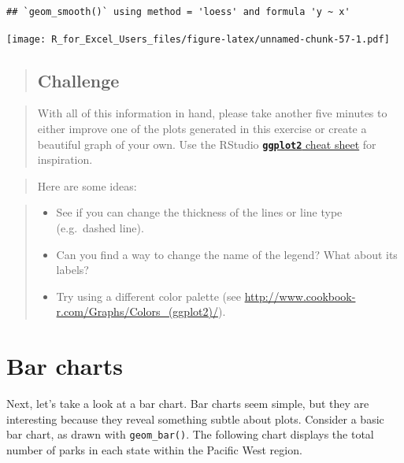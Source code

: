 \documentclass[]{book}
\providecommand{\tightlist}{%
  \setlength{\itemsep}{0pt}\setlength{\parskip}{0pt}}
\begin{document}
\begin{verbatim}
## `geom_smooth()` using method = 'loess' and formula 'y ~ x'
\end{verbatim}

\texttt{[image: R\_for\_Excel\_Users\_files/figure-latex/unnamed-chunk-57-1.pdf]}

\begin{quote}
\hypertarget{challenge}{%
\subsection{Challenge}\label{challenge}}
\end{quote}

\begin{quote}
With all of this information in hand, please take another five minutes to either improve one of the plots generated in this exercise or create a beautiful graph of your own. Use the RStudio \href{https://www.rstudio.com/wp-content/uploads/2016/11/ggplot2-cheatsheet-2.1.pdf}{\textbf{\texttt{ggplot2}} cheat sheet} for inspiration.
\end{quote}

\begin{quote}
Here are some ideas:
\end{quote}

\begin{quote}
\begin{itemize}
\tightlist
\item
  See if you can change the thickness of the lines or line type (e.g.~dashed line).
\item
  Can you find a way to change the name of the legend? What about its labels?
\item
  Try using a different color palette (see \url{http://www.cookbook-r.com/Graphs/Colors_(ggplot2)/}).
\end{itemize}
\end{quote}

\hypertarget{bar-charts}{%
\section{Bar charts}\label{bar-charts}}

Next, let's take a look at a bar chart. Bar charts seem simple, but they are interesting because they reveal something subtle about plots. Consider a basic bar chart, as drawn with \texttt{geom\_bar()}. The following chart displays the total number of parks in each state within the Pacific West region.
\end{document}
